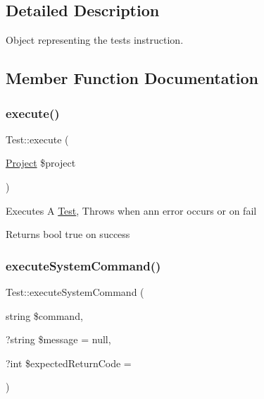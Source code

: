 \subsection{Detailed Description}
Object representing the test\textquotesingle{}s instruction. 

\subsection{Member Function Documentation}
\mbox{\label{classTest_afd7151c1c51e71d95d814b379e0947cd}} 
\subsubsection{\texorpdfstring{execute()}{execute()}}
{\footnotesize\ttfamily Test\+::execute (\begin{DoxyParamCaption}\item[{\hyperlink{classProject}{Project}}]{\$project }\end{DoxyParamCaption})}

Executes A \hyperlink{classTest}{Test}, Throws when ann error occurs or on fail \begin{DoxyReturn}{Returns}
bool true on success 
\end{DoxyReturn}
\mbox{\label{classTest_ac9eac02dbbf02d982dda6b4aaf4e28fd}} 
\subsubsection{\texorpdfstring{execute\+System\+Command()}{executeSystemCommand()}}
{\footnotesize\ttfamily Test\+::execute\+System\+Command (\begin{DoxyParamCaption}\item[{string}]{\$command,  }\item[{?string}]{\$message = {\ttfamily null},  }\item[{?int}]{\$expected\+Return\+Code = {} }\end{DoxyParamCaption})\hspace{0.3cm}{\ttfamily [protected]}}

